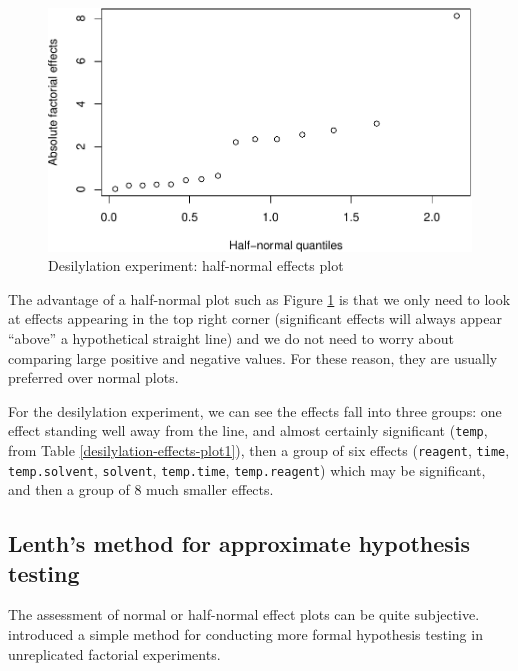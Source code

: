 \documentclass[
]{book}
\theoremstyle{definition}
\theoremstyle{definition}
\theoremstyle{definition}
\theoremstyle{definition}
\theoremstyle{remark}
\begin{document}
\begin{figure}

{\centering \includegraphics{bookdown_math3014-6027_files/figure-latex/desilylation-half-normal-plot-1} 

}

\caption{Desilylation experiment: half-normal effects plot}\label{fig:desilylation-half-normal-plot}
\end{figure}

The advantage of a half-normal plot such as Figure \ref{fig:desilylation-half-normal-plot} is that we only need to look at effects appearing in the top right corner (significant effects will always appear ``above'' a hypothetical straight line) and we do not need to worry about comparing large positive and negative values. For these reason, they are usually preferred over normal plots.

For the desilylation experiment, we can see the effects fall into three groups: one effect standing well away from the line, and almost certainly significant (\texttt{temp}, from Table \ref{desilylation-effects-plot1}), then a group of six effects (\texttt{reagent}, \texttt{time}, \texttt{temp.solvent}, \texttt{solvent}, \texttt{temp.time}, \texttt{temp.reagent}) which may be significant, and then a group of 8 much smaller effects.

\hypertarget{lenths-method-for-approximate-hypothesis-testing}{%
\subsection{Lenth's method for approximate hypothesis testing}\label{lenths-method-for-approximate-hypothesis-testing}}

The assessment of normal or half-normal effect plots can be quite subjective. \citet{Lenth1989} introduced a simple method for conducting more formal hypothesis testing in unreplicated factorial experiments.
\end{document}
